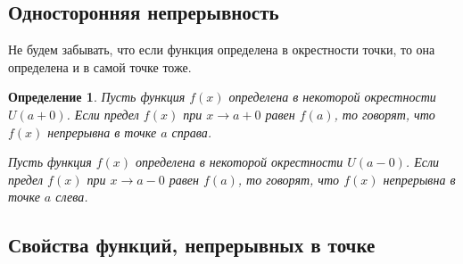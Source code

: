 \documentclass[a4paper,12pt]{article} %
\newtheorem{definition}{Определение}[section]
\theoremstyle{remark}
\theoremstyle{definition}
\begin{document}
\subsection{Односторонняя непрерывность}
Не будем забывать, что если функция определена в окрестности точки, то она определена и в самой точке тоже.
\begin{definition}
	Пусть функция $f(x)$ определена в некоторой окрестности $U(a+0)$. Если предел $f(x)$ при $x\to a+0$ равен $f(a)$, то говорят, что $f(x)$ непрерывна в точке $a$ справа.

	Пусть функция $f(x)$ определена в некоторой окрестности $U(a-0)$. Если предел $f(x)$ при $x\to a-0$ равен $f(a)$, то говорят, что $f(x)$ непрерывна в точке $a$ слева.

\end{definition}

\subsection{Свойства функций, непрерывных в точке}
\end{document}
